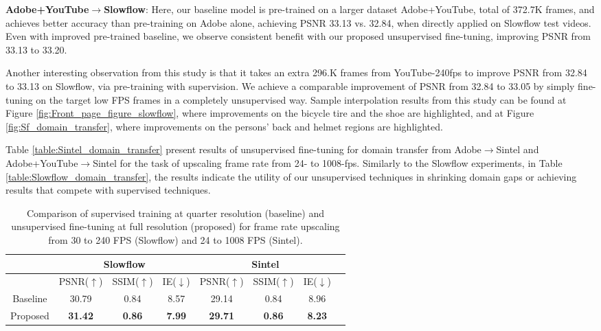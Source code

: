 \documentclass[10pt,twocolumn,letterpaper]{article}
\renewcommand{\textrightarrow}{$\rightarrow$}
\begin{document}
\noindent\textbf{Adobe+YouTube\textrightarrow Slowflow}: Here, our baseline model is pre-trained on a larger dataset Adobe+YouTube, total of 372.7K frames, and achieves better accuracy than pre-training on Adobe alone, achieving PSNR 33.13 vs. 32.84, when directly applied on Slowflow test videos. Even with improved pre-trained baseline, we observe consistent benefit with our proposed unsupervised fine-tuning, improving PSNR from 33.13 to 33.20.

Another interesting observation from this study is that it takes an extra 296.K frames from YouTube-240fps to improve PSNR from 32.84 to 33.13 on Slowflow, via pre-training with supervision. We achieve a comparable improvement of PSNR from 32.84 to 33.05 by simply fine-tuning on the target low FPS frames in a completely unsupervised way. 
Sample interpolation results from this study can be found at Figure \ref{fig:Front_page_figure_slowflow}, where improvements on the bicycle tire and the shoe are highlighted, and at Figure \ref{fig:Sf_domain_transfer}, where improvements on the persons' back and helmet regions are highlighted.

Table \ref{table:Sintel_domain_transfer} present results of unsupervised fine-tuning for domain transfer from Adobe\textrightarrow Sintel and Adobe+YouTube\textrightarrow Sintel for the task of upscaling frame rate from 24- to 1008-fps. Similarly to the Slowflow experiments, in Table \ref{table:Slowflow_domain_transfer}, the results indicate the utility of our unsupervised techniques in shrinking domain gaps or achieving results that compete with supervised techniques.




\begin{table}[h]
\small
\renewcommand\tabcolsep{3.0pt}
\centering
\begin{tabular}{c  c  c  c   |  c  c  c  c}
\hline
& \multicolumn{3}{c}{\textbf{Slowflow}} & \multicolumn{3}{c}{\textbf{Sintel}} \\
\hline
 & PSNR($\uparrow$)  & SSIM($\uparrow$) & IE($\downarrow$) &  PSNR($\uparrow$)  & SSIM($\uparrow$) & IE($\downarrow$) \\ 
\hline
Baseline & 30.79 & 0.84 & 8.57 & 29.14  & 0.84  & 8.96\\ 
Proposed & \textbf{31.42} & \textbf{0.86}& \textbf{7.99} & \textbf{29.71}  & \textbf{0.86}  & \textbf{8.23} \\ 
\hline
\end{tabular}
\caption{Comparison of supervised training at quarter resolution (baseline) and unsupervised fine-tuning at full resolution (proposed) for frame rate upscaling from 30 to 240 FPS (Slowflow) and 24 to 1008 FPS (Sintel).}
\label{table:Slowflow_Sintel_spatial_transfer}
\end{table}
\end{document}
